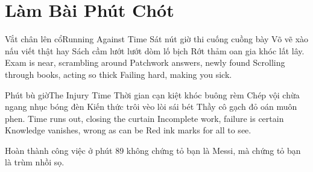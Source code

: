\chapter{Làm Bài Phút Chót}

\begin{tutuyetbox}{Vắt chân lên cổ}{Running Against Time}
Sát nút giờ thi cuống cuồng bày
Võ vẽ xào nấu viết thật hay
Sách cầm lướt lướt dòm lố bịch
Rớt thảm oan gia khóc lất lây.
\tcblower
Exam is near, scrambling around 
Patchwork answers, newly found 
Scrolling through books, acting so thick 
Failing hard, making you sick.
\end{tutuyetbox}

\begin{tutuyetbox}{Phút bù giờ}{The Injury Time}
Thời gian cạn kiệt khóc buông rèm
Chép vội chừa ngang nhục bóng đèn
Kiến thức trôi vèo lòi sái bét
Thầy cô gạch đỏ oán muôn phen.
\tcblower
Time runs out, closing the curtain 
Incomplete work, failure is certain 
Knowledge vanishes, wrong as can be 
Red ink marks for all to see.
\end{tutuyetbox}

\begin{ghichu}
Hoàn thành công việc ở phút 89 không chứng tỏ bạn là Messi, mà chứng tỏ bạn là trùm nhồi sọ.
\end{ghichu}